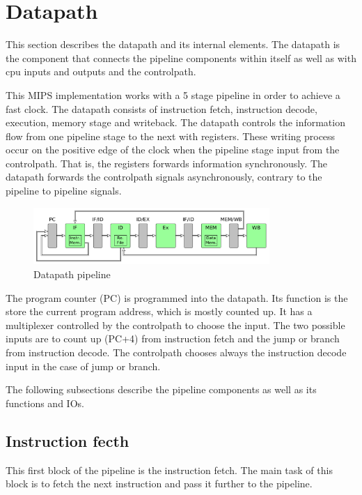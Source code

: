 \section{Datapath}
This section describes the datapath and its internal elements. The datapath is the component that connects the pipeline components within itself as well as with cpu inputs and outputs and the controlpath.

This MIPS implementation works with a 5 stage pipeline in order to achieve a fast clock. The datapath consists of instruction fetch, instruction decode, execution, memory stage and writeback.
The datapath controls the information flow from one pipeline stage to the next with registers. 
These writing process occur on the positive edge of the clock when the pipeline stage input from the controlpath. That is, the registers forwards information synchronously. 
The datapath forwards the controlpath signals asynchronously, contrary to the pipeline to pipeline signals.



\begin{figure}[h!]
  \centering
  \includegraphics[width=0.8\textwidth]{figure/datapath.png}
  \caption{Datapath pipeline}
  \label{fig:datapath}
\end{figure}

The program counter (PC) is programmed into the datapath. Its function is the store the current program address, which is mostly counted up.
It has a multiplexer controlled by the controlpath to choose the input. The two possible inputs are to count up (PC+4) from instruction fetch
and the jump or branch from instruction decode. The controlpath chooses always the instruction decode input in the case of jump or branch. 


The following subsections describe the pipeline components as well as its functions and IOs. 

\subsection{Instruction fecth}
This first block of the pipeline is the instruction fetch. The main task of this block is to fetch the next instruction and pass it further to the pipeline. 

